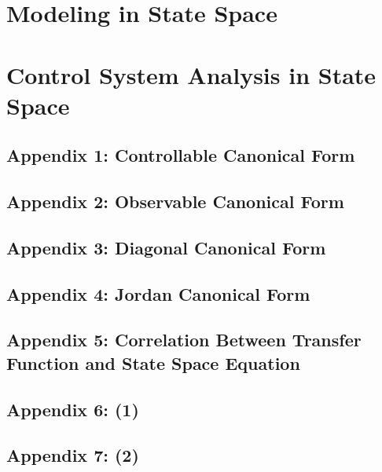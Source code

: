 \documentclass[11pt]{report}
\begin{document}
\tableofcontents



\chapter{Modeling in State Space}


\chapter{Control System Analysis in State Space}


\section{Appendix 1: Controllable Canonical Form}


\section{Appendix 2: Observable Canonical Form}


\section{Appendix 3: Diagonal Canonical Form}


\section{Appendix 4: Jordan Canonical Form}


\section{Appendix 5: Correlation Between Transfer Function and State Space Equation}


\section{Appendix 6: (1)}


\section{Appendix 7: (2)}

\end{document}
